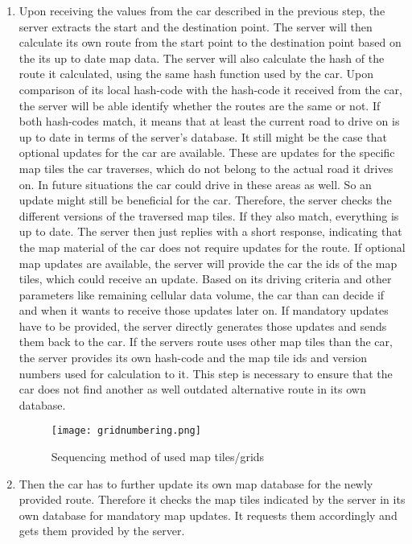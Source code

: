 \begin{enumerate}
\item Upon receiving the values from the car described in the previous step, the server extracts the start and the destination point. The server will then calculate its own route from the start point to the destination point based on the its up to date map data. The server will also calculate the hash of the route it calculated, using the same hash function used by the car. Upon comparison of its local hash-code with the hash-code it received from the car, the server will be able identify whether the routes are the same or not. If both hash-codes match, it means that at least the current road to drive on is up to date in terms of the server's database. It still might be the case that optional updates for the car are available. These are updates for the specific map tiles the car traverses, which do not belong to the actual road it drives on. In future situations the car could drive in these areas as well. So an update might still be beneficial for the car. Therefore, the server checks the different versions of the traversed map tiles. If they also match, everything is up to date. The server then just replies with a short response, indicating that the map material of the car does not require updates for the route. If optional map updates are available, the server will provide the car the ids of the map tiles, which could receive an update. Based on its driving criteria and other parameters like remaining cellular data volume, the car than can decide if and when it wants to receive those updates later on. If mandatory updates have to be provided, the server directly generates those updates and sends them back to the car. If the servers route uses other map tiles than the car, the server provides its own hash-code and the map tile ids and version numbers used for calculation to it. This step is necessary to ensure that the car does not find another as well outdated alternative route in its own database. 


\begin{figure}
\centering
\texttt{[image: gridnumbering.png]}
\label{fg:numberingtiles}
\caption{Sequencing method of used map tiles/grids}
\end{figure}




\item Then the car has to further update its own map database for the newly provided route. Therefore it checks the map tiles indicated by the server in its own database for mandatory map updates. It requests them accordingly and gets them provided by the server.


\end{enumerate}
